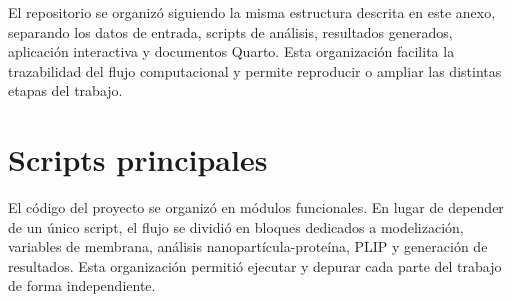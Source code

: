\documentclass[
  spanish,
  a4paper,
  12pt,
  oneside,
  openany]{memoir}
\begin{document}
El repositorio se organizó siguiendo la misma estructura descrita en
este anexo, separando los datos de entrada, scripts de análisis,
resultados generados, aplicación interactiva y documentos Quarto. Esta
organización facilita la trazabilidad del flujo computacional y permite
reproducir o ampliar las distintas etapas del trabajo.

\section{Scripts principales}

El código del proyecto se organizó en módulos funcionales. En lugar de
depender de un único script, el flujo se dividió en bloques dedicados a
modelización, variables de membrana, análisis nanopartícula-proteína,
PLIP y generación de resultados. Esta organización permitió ejecutar y
depurar cada parte del trabajo de forma independiente.

\begingroup
\footnotesize
\setlength{\tabcolsep}{4pt}
\renewcommand{\arraystretch}{1.12}
\end{document}
